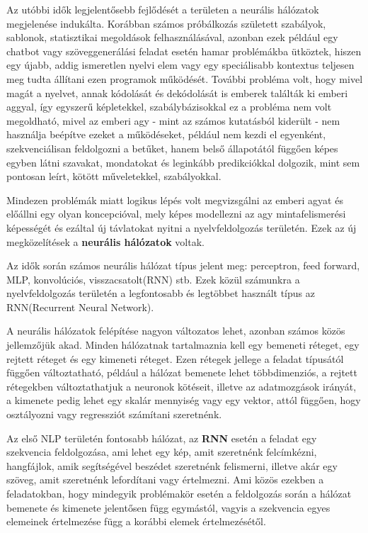 
Az utóbbi idők legjelentősebb fejlődését a területen a neurális hálózatok megjelenése indukálta. Korábban számos próbálkozás született szabályok, sablonok, statisztikai megoldások felhasználásával, azonban ezek például egy chatbot vagy szöveggenerálási feladat esetén hamar problémákba ütköztek, hiszen egy újabb, addig ismeretlen nyelvi elem vagy egy speciálisabb kontextus teljesen meg tudta állítani ezen programok működését. További probléma volt, hogy mivel magát a nyelvet, annak kódolását és dekódolását is emberek találták ki emberi aggyal, így egyszerű képletekkel, szabálybázisokkal ez a probléma nem volt megoldható, mivel az emberi agy - mint az számos kutatásból kiderült\cite{human_reading} - nem használja beépítve ezeket a működéseket, például nem kezdi el egyenként, szekvenciálisan feldolgozni a betűket, hanem belső állapotától függően képes egyben látni szavakat, mondatokat és leginkább predikciókkal dolgozik, mint sem pontosan leírt, kötött műveletekkel, szabályokkal.


Mindezen problémák miatt logikus lépés volt megvizsgálni az emberi agyat és előállni egy olyan koncepcióval, mely képes modellezni az agy mintafelismerési képességét és ezáltal új távlatokat nyitni a nyelvfeldolgozás területén. Ezek az új megközelítések a \textbf{neurális hálózatok} voltak.

Az idők során számos neurális hálózat típus jelent meg: perceptron, feed forward, MLP, konvolúciós, visszacsatolt(RNN) stb. Ezek közül számunkra a nyelvfeldolgozás területén a legfontosabb és legtöbbet használt típus az RNN(Recurrent Neural Network).

A neurális hálózatok felépítése nagyon változatos lehet, azonban számos közös jellemzőjük akad. Minden hálózatnak tartalmaznia kell egy bemeneti réteget, egy rejtett réteget és egy kimeneti réteget. Ezen rétegek jellege a feladat típusától függően változtatható, például a hálózat bemenete lehet többdimenziós, a rejtett rétegekben változtathatjuk a neuronok kötéseit, illetve az adatmozgások irányát, a kimenete pedig lehet egy skalár mennyiség vagy egy vektor, attól függően, hogy osztályozni vagy regressziót számítani szeretnénk.

Az első NLP területén fontosabb hálózat, az \textbf{RNN} esetén a feladat egy szekvencia feldolgozása, ami lehet egy kép, amit szeretnénk felcímkézni, hangfájlok, amik segítségével beszédet szeretnénk felismerni, illetve akár egy szöveg, amit szeretnénk lefordítani vagy értelmezni. Ami közös ezekben a feladatokban, hogy mindegyik problémakör esetén a feldolgozás során a hálózat bemenete és kimenete jelentősen függ egymástól, vagyis a szekvencia egyes elemeinek értelmezése függ a korábbi elemek értelmezésétől.

